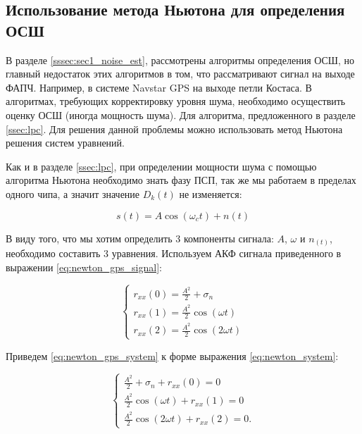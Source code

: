 \subsection{Использование метода Ньютона для определения ОСШ}
В разделе \ref{sssec:sec1_noise_est}, рассмотрены алгоритмы определения ОСШ, но главный недостаток этих алгоритмов в том, что
рассматривают сигнал на выходе ФАПЧ. Например, в системе Navstar GPS на выходе петли Костаса. В алгоритмах, требующих
корректировку уровня шума, необходимо осуществить оценку ОСШ (иногда мощность шума). Для алгоритма, предложенного
в разделе \ref{ssec:lpc}. Для решения данной проблемы можно использовать метод Ньютона решения систем уравнений.

Как и в разделе \ref{ssec:lpc}, при определении мощности шума с помощью алгоритма Ньютона необходимо знать фазу ПСП,
так же мы работаем в пределах одного чипа, а значит значение ${D_k(t)}$ не изменяется:

\begin{center}
\begin{equation}
	\label{eq:newton_gps_signal}
	s(t) = A \cos(\omega_{c}t) + n(t)
\end{equation}
\end{center}

В виду того, что мы хотим определить 3 компоненты сигнала: ${A}$, ${\omega}$ и ${n_(t)}$, необходимо составить 3 уравнения.
Используем АКФ сигнала приведенного в выражении \ref{eq:newton_gps_signal}:
\begin{center}
\begin{equation}
	\label{eq:newton_gps_system}
		\begin{cases}
			r_{xx}(0) = \frac{A^2}{2} + \sigma_n \\
			r_{xx}(1) = \frac{A^2}{2} \cos(\omega t) \\
			r_{xx}(2) = \frac{A^2}{2} \cos(2 \omega t)
		\end{cases}
\end{equation}
\end{center}

Приведем \ref{eq:newton_gps_system} к форме выражения \ref{eq:newton_system}:
\begin{center}
\begin{equation}
	\label{eq:newton_gps_system2}
		\begin{cases}
			\frac{A^2}{2} + \sigma_n + r_{xx}(0) = 0 \\
			\frac{A^2}{2} \cos(\omega t) + r_{xx}(1) = 0 \\
			\frac{A^2}{2} \cos(2 \omega t) + r_{xx}(2) = 0. 
		\end{cases}
\end{equation}
\end{center}

